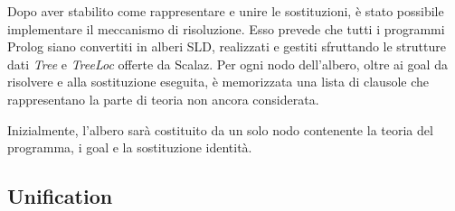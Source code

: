 Dopo aver stabilito come rappresentare e unire le sostituzioni, è stato possibile implementare il meccanismo di risoluzione. Esso prevede che tutti i programmi Prolog siano convertiti in alberi SLD, realizzati e gestiti sfruttando le strutture dati \textit{Tree} e \textit{TreeLoc} offerte da Scalaz. Per ogni nodo dell'albero, oltre ai goal da risolvere e alla sostituzione eseguita, è memorizzata una lista di clausole che rappresentano la parte di teoria non ancora considerata.

Inizialmente, l'albero sarà costituito da un solo nodo contenente la teoria del programma, i goal e la sostituzione identità.



\subsection{Unification}
